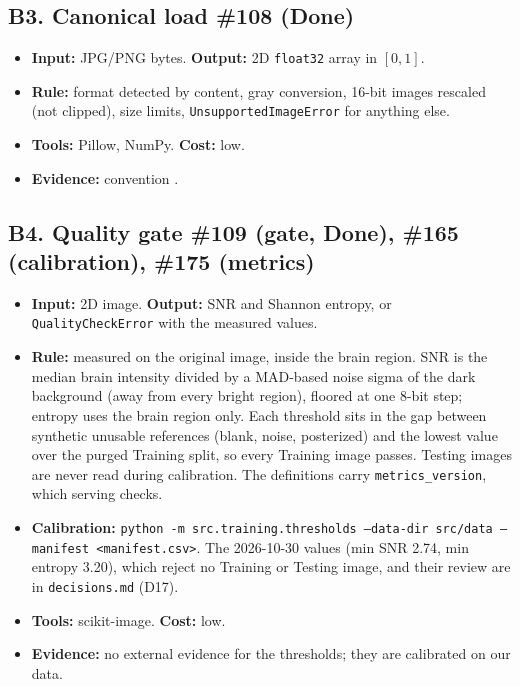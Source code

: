 \documentclass[11pt,a4paper]{article}
\newcommand{\board}[1]{\textsf{\##1}}
\begin{document}
\subsection*{B3. Canonical load \hfill \board{108} (Done)}
\begin{itemize}
  \item \textbf{Input:} JPG/PNG bytes. \textbf{Output:} 2D \texttt{float32} array in $[0,1]$.
  \item \textbf{Rule:} format detected by content, gray conversion, 16-bit images rescaled (not clipped), size limits, \texttt{UnsupportedImageError} for anything else.
  \item \textbf{Tools:} Pillow, NumPy. \textbf{Cost:} low.
  \item \textbf{Evidence:} convention \cite{r5}.
\end{itemize}

\subsection*{B4. Quality gate \hfill \board{109} (gate, Done), \board{165} (calibration), \board{175} (metrics)}
\begin{itemize}
  \item \textbf{Input:} 2D image. \textbf{Output:} SNR and Shannon entropy, or \texttt{QualityCheckError} with the measured values.
  \item \textbf{Rule:} measured on the original image, inside the brain region. SNR is the median brain intensity divided by a MAD-based noise sigma of the dark background (away from every bright region), floored at one 8-bit step; entropy uses the brain region only. Each threshold sits in the gap between synthetic unusable references (blank, noise, posterized) and the lowest value over the purged Training split, so every Training image passes. Testing images are never read during calibration. The definitions carry \texttt{metrics\_version}, which serving checks.
  \item \textbf{Calibration:} \texttt{python -m src.training.thresholds --data-dir src/data --manifest <manifest.csv>}. The 2026-10-30 values (min SNR 2.74, min entropy 3.20), which reject no Training or Testing image, and their review are in \texttt{decisions.md} (D17).
  \item \textbf{Tools:} scikit-image. \textbf{Cost:} low.
  \item \textbf{Evidence:} no external evidence for the thresholds; they are calibrated on our data.
\end{itemize}
\end{document}
